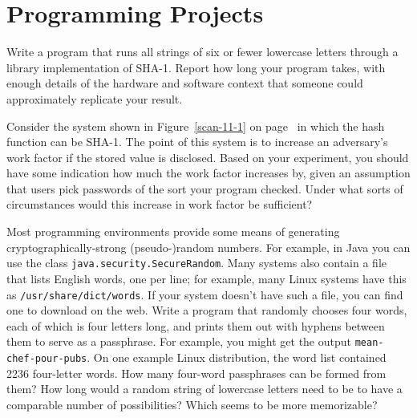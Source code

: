\section*{Programming Projects}

\begin{chapterEnumerate}

\item
Write a program that runs all strings of six or fewer lowercase
letters through a library implementation of SHA-1.  Report how long
your program takes, with enough details of the hardware and software
context that someone could approximately replicate your result.

Consider the system shown in Figure~\ref{scan-11-1} on
page~\pageref{scan-11-1} in which the hash function can be SHA-1.
The point of this system is to increase an adversary's work factor if
the stored value is disclosed.  Based on your experiment, you should
have some indication how much the work factor increases by, given an
assumption that users pick passwords of the sort your program
checked.  Under what sorts of circumstances would this increase in
work factor be sufficient?

\item
Most programming environments provide some means of generating
cryptographically-strong (pseudo-)random numbers. For example,
in Java you can use the class \texttt{java.security.SecureRandom}.
Many systems also contain a file that lists English words, one per line;
for example, many Linux systems have this as {\tt /usr/share/dict/words}.
If your system doesn't have such a file, you can find one to download on
the web.
Write
a program that randomly chooses four words, each of which is four
letters long, and prints them
out with hyphens between them to serve as a passphrase.  For
example, you might get the output {\tt mean-chef-pour-pubs}.  On one
example Linux distribution, the word list contained 2236 four-letter
words.  How many four-word passphrases can be formed from them?  How
long would a random string of lowercase letters need to be to have a
comparable number of possibilities?  Which seems to be more memorizable?

\end{chapterEnumerate}

